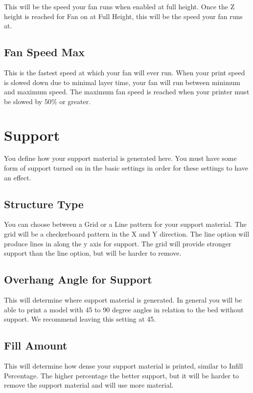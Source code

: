 This will be the speed your fan runs when enabled at full height. Once the Z height is reached for Fan on at Full Height, this will be the speed your fan runs at.

\subsection{Fan Speed Max}
This is the fastest speed at which your fan will ever run. When your print speed is slowed down due to minimal layer time, your fan will run between minimum and maximum speed. The maximum fan speed is reached when your printer must be slowed by 50\% or greater.

\section{Support}
You define how your support material is generated here. You must have some form of support turned on in the basic settings in order for these settings to have an effect.

\subsection{Structure Type}
You can choose between a Grid or a Line pattern for your support material. The grid will be a checkerboard pattern in the X and Y direction. The line option will produce lines in along the y axis for support. The grid will provide stronger support than the line option, but will be harder to remove.

\subsection{Overhang Angle for Support}
This will determine where support material is generated. In general you will be able to print a model with 45 to 90 degree angles in relation to the bed without support. We recommend leaving this setting at 45.

\subsection{Fill Amount}
This will determine how dense your support material is printed, similar to Infill Percentage. The higher percentage the better support, but it will be harder to remove the support material and will use more material.

